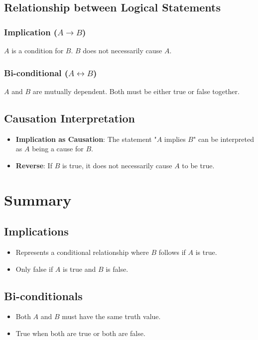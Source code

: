 \documentclass{article}
\begin{document}
\subsection{Relationship between Logical Statements}

\subsubsection{Implication ($A \rightarrow B$)}
$A$ is a condition for $B$. $B$ does not necessarily cause $A$.

\subsubsection{Bi-conditional ($A \leftrightarrow B$)}
$A$ and $B$ are mutually dependent. Both must be either true or false together.

\subsection{Causation Interpretation}

\begin{itemize}
    \item \textbf{Implication as Causation}: The statement "$A$ implies $B$" can be interpreted as $A$ being a cause for $B$.
    \item \textbf{Reverse}: If $B$ is true, it does not necessarily cause $A$ to be true.
\end{itemize}

\section{Summary}

\subsection{Implications}
\begin{itemize}
    \item Represents a conditional relationship where $B$ follows if $A$ is true.
    \item Only false if $A$ is true and $B$ is false.
\end{itemize}

\subsection{Bi-conditionals}
\begin{itemize}
    \item Both $A$ and $B$ must have the same truth value.
    \item True when both are true or both are false.
\end{itemize}
\end{document}
